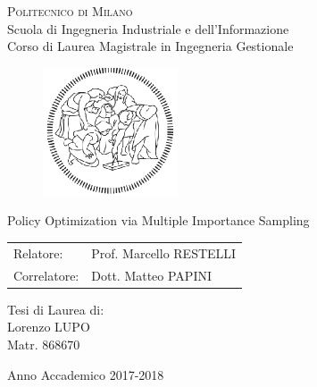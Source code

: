 \begin{titlepage}

	\begin{center}
		\normalsize
			\textsc{Politecnico di Milano}\\
			Scuola di Ingegneria Industriale e dell'Informazione\\
      		Corso di Laurea Magistrale in Ingegneria Gestionale\\
	\end{center}
	\vspace{.6cm}

	\begin{figure}[htpb]
		\centering
		\includegraphics[width=4cm]{Cover/polimi}
	\end{figure}
	\vspace{.6cm}

	\begin{center}
		\LARGE
			Policy Optimization via Multiple Importance Sampling
	\end{center}
	\vspace{1.6cm}

	\begin{flushleft}
		\large
		\begin{tabular}{ll}
		Relatore:    & Prof. Marcello RESTELLI      \\
		Correlatore: & Dott. Matteo PAPINI
		\end{tabular}
		\vspace{1cm}
	\end{flushleft}

	\begin{flushright}
		\large
		Tesi di Laurea di:\\
		Lorenzo LUPO\\
		Matr. 868670\\
	\end{flushright}

	\vspace*{\fill}
	\begin{center}
		Anno Accademico 2017-2018
	\end{center}

\end{titlepage}
